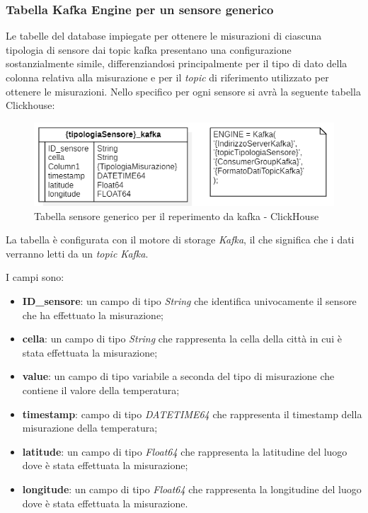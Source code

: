 \subsubsection{Tabella Kafka Engine per un sensore generico}
Le tabelle del database impiegate per ottenere le misurazioni di ciascuna tipologia di sensore dai topic kafka presentano una configurazione sostanzialmente simile, differenziandosi principalmente per il tipo di dato della colonna relativa alla misurazione e per il \textit{topic} di riferimento utilizzato per ottenere le misurazioni.
Nello specifico per ogni sensore si avrà la seguente tabella Clickhouse:
\begin{figure}[H]
    \centering
    \includegraphics[width=.6\textwidth]{../Images/SpecificaTecnica/sensorType_kafka.PNG}
    \caption{Tabella sensore generico per il reperimento da kafka - ClickHouse}
    \label{fig:Reperimento_kafka_clickhouse}
  \end{figure}

    La tabella è configurata con il motore di storage \textit{Kafka}, il che significa che i dati verranno letti da un \textit{topic Kafka}. 

    I campi sono:
    \begin{itemize}
        \item \textbf{ID\_sensore}: un campo di tipo \textit{String} che identifica univocamente il sensore che ha effettuato la misurazione;
        \item \textbf{cella}: un campo di tipo \textit{String} che rappresenta la cella della città in cui è stata effettuata la misurazione;
        \item \textbf{value}: un campo di tipo variabile a seconda del tipo di misurazione che contiene il valore della temperatura;
        \item \textbf{timestamp}: campo di tipo \textit{DATETIME64} che rappresenta il timestamp della misurazione della temperatura;
        \item \textbf{latitude}: un campo di tipo \textit{Float64} che rappresenta la latitudine del luogo dove è stata effettuata la misurazione;
        \item \textbf{longitude}: un campo di tipo \textit{Float64} che rappresenta la longitudine del luogo dove è stata effettuata la misurazione.
    \end{itemize}

